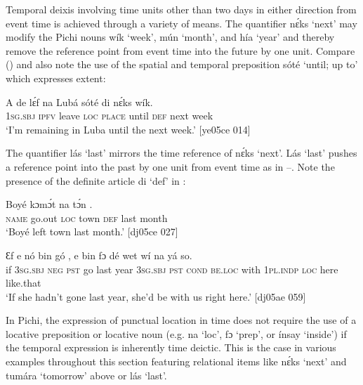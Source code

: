 Temporal deixis involving time units other than two days in either direction from event time is achieved through a variety of means. The quantifier{\fff} nɛ́ks ‘next’ may modify the Pichi nouns wík ‘week’, mún ‘month’, and hía ‘year’ and thereby remove the reference point from event time into the future by one unit. Compare () and also note the use of the spatial and temporal preposition sóté ‘until; up to’ which expresses extent: 



\ea%
    \label{ex:key:1014}
    \gll A    de  lɛ́f    na  Lubá  sóté    di  nɛ́ks  wík.\\
\textsc{1sg.sbj}  \textsc{ipfv}  leave  \textsc{loc}  \textsc{place}  until  \textsc{def}  next    week\\

\glt ‘I’m remaining in Luba until the next week.’ [ye05ce 014]
\z

The quantifier lás ‘last’ mirrors the time reference of nɛ́ks ‘next’. Lás ‘last’ pushes a reference point into the past by one unit from event time as in –. Note the presence of the definite article di ‘def’ in : {\fff}


\ea%
    \label{ex:key:1015}
    \gll Boyé  kɔmɔ́t  na  tɔ́n       .\\
\textsc{name}  go.out  \textsc{loc}  town  \textsc{def}  last  month\\

\glt ‘Boyé left town last month.’ [dj05ce 027]
\z


\ea%
    \label{ex:key:1016}
    \gll Ɛf  e    nó  bin  gó   ,    e    bin  fɔ    dé
wet    wí    na  yá    so.\\
if  \textsc{3sg.sbj}  \textsc{neg}  \textsc{pst}  go  last  year    \textsc{3sg.sbj}  \textsc{pst}  \textsc{cond}    \textsc{be.loc}
with    \textsc{1pl.indp}  \textsc{loc}  here    like.that\\

\glt ‘If she hadn’t gone last year, she’d be with us right here.’ [dj05ae 059]
\z

In Pichi, the expression of punctual location in time does not require the use of a locative preposition{\fff} or locative noun{\fff} (e.g. na ‘loc’, fɔ ‘prep’, or ínsay ‘inside’) if the temporal expression is inherently time deictic. This is the case in various examples throughout this section featuring relational items like nɛ́ks ‘next’ and tumára ‘tomorrow’ above or lás ‘last’. 


